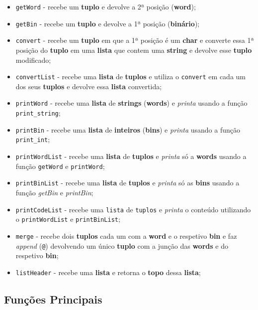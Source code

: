 \documentclass[11pt]{article}   %
\begin{document}
\begin{itemize}
    \item \verb|getWord| - recebe um \textbf{tuplo} e devolve a 2ª posição (\textbf{word});
    \item \verb|getBin| - recebe um \textbf{tuplo} e devolve a 1ª posição (\textbf{binário});
    \item \verb|convert| - recebe um \textbf{tuplo} em que a 1ª posição é um \textbf{char} e 
    converte essa 1ª posição do \textbf{tuplo} em uma \textbf{lista} que contem uma \textbf{string}
    e devolve esse \textbf{tuplo} modificado;
    \item \verb|convertList| - recebe uma \textbf{lista} de \textbf{tuplos} e utiliza o \verb|convert|
    em cada um dos seus \textbf{tuplos} e devolve essa \textbf{lista} convertida;
    \item \verb|printWord| - recebe uma \textbf{lista} de \textbf{strings} (\textbf{words}) e 
    \textit{printa} usando a função \verb|print_string|;
    \item \verb|printBin| - recebe uma \textbf{lista} de \textbf{inteiros} (\textbf{bins}) e 
    \textit{printa} usando a função \verb|print_int|;
    \item \verb|printWordList| - recebe uma \textbf{lista} de \textbf{tuplos} e \textit{printa} só a 
    \textbf{words} usando a função \verb|getWord| e \verb|printWord|;
    \item \verb|printBinList| - recebe uma \textbf{lista} de \textbf{tuplos} e \textit{printa} só as 
    \textbf{bins} usando a função \textit{getBin} e \textit{printBin};
    \item \verb|printCodeList| - recebe uma \verb|lista| de \verb|tuplos| e \textit{printa} o conteúdo
    utilizando o \verb|printWordList| e \verb|printBinList|;
    \item \verb|merge| - recebe dois \textbf{tuplos} cada um com a \textbf{word} e o respetivo \textbf{bin}
    e faz \textit{append} (\verb|@|) devolvendo um único \textbf{tuplo} com a junção das \textbf{words} e 
    do respetivo \textbf{bin};
    \item \verb|listHeader| - recebe uma \textbf{lista} e retorna o \textbf{topo} dessa \textbf{lista};
\end{itemize}

\subsection{Funções Principais}
\end{document}
